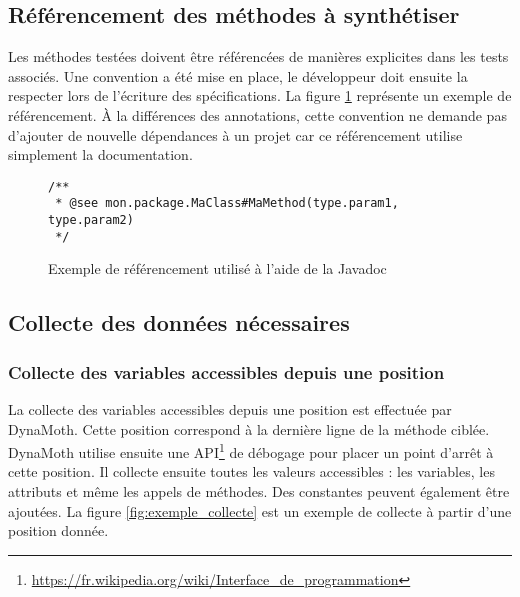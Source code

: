 \subsection{Référencement des méthodes à synthétiser}
\label{subsec:ciblage}
\par Les méthodes testées doivent être référencées de manières explicites dans les tests associés. Une convention a été mise en place, le développeur doit ensuite la respecter lors de l'écriture des spécifications. La figure \ref{fig:ciblage} représente un exemple de référencement. À la différences des annotations, cette convention ne demande pas d'ajouter de nouvelle dépendances à un projet car ce référencement utilise simplement la documentation.

\begin{figure}[H]
\begin{lstlisting}
/**
 * @see mon.package.MaClass#MaMethod(type.param1, type.param2)
 */
\end{lstlisting}
\caption{Exemple de référencement utilisé à l'aide de la Javadoc}
\label{fig:ciblage}
\end{figure}



\subsection{Collecte des données nécessaires}

\subsubsection{Collecte des variables accessibles depuis une position}
\label{subsec:collecte_entree}
\par La collecte des variables accessibles depuis une position est effectuée par DynaMoth. Cette position correspond à la dernière ligne de la méthode ciblée. DynaMoth utilise ensuite une API\footnote{\url{https://fr.wikipedia.org/wiki/Interface_de_programmation}} de débogage pour placer un point d'arrêt à cette position. Il collecte ensuite toutes les valeurs accessibles : les variables, les attributs et même les appels de méthodes. Des constantes peuvent également être ajoutées. La figure \ref{fig:exemple_collecte} est un exemple de collecte à partir d'une position donnée.

